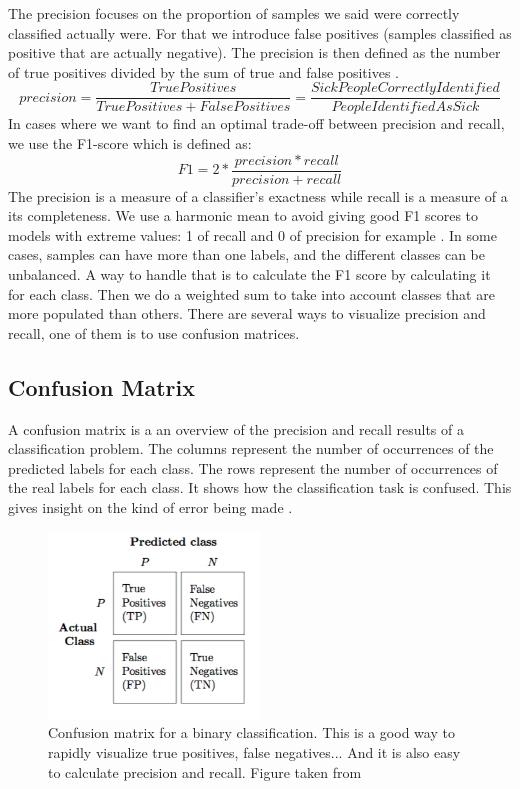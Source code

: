 The precision focuses on the proportion of samples we said were correctly classified actually were. For that we introduce false positives (samples classified as positive that are actually negative). The precision is then defined as the number of true positives divided by the sum of true and false positives \cite{metrics}.
\[precision = \frac{True Positives}{True Positives + False Positives} = \frac{Sick People Correctly Identified}{People Identified As Sick}\]
 In cases where we want to find an optimal trade-off between precision and recall, we use the F1-score which is defined as: 
 \[F1 = 2*\frac{precision * recall}{precision + recall} \]
 The precision is a measure of a classifier's exactness while recall is a measure of a its completeness. 
 We use a harmonic mean to avoid giving good F1 scores to models with extreme values: 1 of recall and 0 of precision for example \cite{wiki-f1}. 
In some cases, samples can have more than one labels, and the different classes can be unbalanced. A way to handle that is to calculate the F1 score by calculating it for each class.  Then we do a weighted sum to take into account classes that are more populated than others. 
There are several ways to visualize precision and recall, one of them is to use confusion matrices. 
\subsection{Confusion Matrix}
A confusion matrix is a an overview of the precision and recall results of a classification problem. The columns represent the number of occurrences of the predicted labels for each class. The rows represent the number of occurrences of the real labels for each class. It shows how the classification task is confused. This gives insight on the kind of error being made \cite{cm}. 

\begin{figure}[h]
    \centering
        \includegraphics[width=0.5\textwidth]{figures/02-CM}
        \caption[Confusion matrix]{Confusion matrix for a binary classification. This is a good way to rapidly visualize true positives, false negatives... And it is also easy to calculate precision and recall. Figure taken from \cite{cm_image}}\label{fig:CM}
\end{figure}

